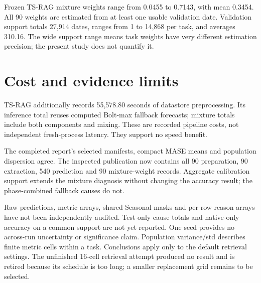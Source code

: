 \documentclass[11pt,a4paper]{article}
\begin{document}
Frozen TS-RAG mixture weights range from 0.0455 to 0.7143, with mean 0.3454.
All 90 weights are estimated from at least one usable validation date.
Validation support totals 27,914 dates, ranges from 1 to 14,868 per task,
and averages 310.16. The wide support range means task weights have very
different estimation precision; the present study does not quantify it.

\section{Cost and evidence limits}
TS-RAG additionally records 55,578.80 seconds of datastore preprocessing.
Its inference total reuses computed Bolt-max fallback forecasts; mixture
totals include both components and mixing. These are recorded pipeline
costs, not independent fresh-process latency. They support no speed benefit.

The completed report's selected manifests, compact MASE means and population
dispersion agree. The inspected publication now contains all 90 preparation,
90 extraction, 540 prediction and 90 mixture-weight records. Aggregate
calibration support extends the mixture diagnosis without changing the accuracy
result; the phase-combined fallback causes do not.

Raw predictions, metric arrays, shared Seasonal masks and per-row reason
arrays have not been independently audited. Test-only cause totals and
native-only accuracy on a common support are not yet reported. One seed
provides no across-run uncertainty or significance
claim. Population variance/std describes finite metric cells within a task.
Conclusions apply only to the default retrieval settings. The unfinished
16-cell retrieval attempt produced no result and is retired because its schedule
is too long; a smaller replacement grid remains to be selected.
\end{document}
